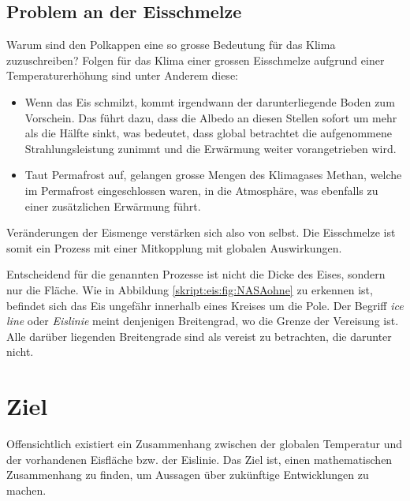 \begin{refsection}
\subsection{Problem an der Eisschmelze} \label{skript:eis:Problem an der Eisschmelze}
Warum sind den Polkappen eine so grosse Bedeutung für das Klima zuzuschreiben? Folgen für das Klima einer grossen Eisschmelze aufgrund einer Temperaturerhöhung sind unter Anderem diese: 
\begin{itemize}
	\item Wenn das Eis schmilzt, kommt irgendwann der darunterliegende Boden zum Vorschein. Das führt dazu, dass die Albedo an diesen Stellen sofort um mehr als die Hälfte sinkt, was bedeutet, dass global betrachtet die aufgenommene Strahlungsleistung zunimmt und die Erwärmung weiter vorangetrieben wird.
	\item Taut Permafrost auf, gelangen grosse Mengen des Klimagases Methan, welche im Permafrost eingeschlossen waren, in die Atmosphäre, was ebenfalls zu einer zusätzlichen Erwärmung führt.
\end{itemize}
Veränderungen der Eismenge verstärken sich also von selbst.
Die Eisschmelze ist somit ein Prozess mit einer Mitkopplung mit globalen Auswirkungen.

Entscheidend für die genannten Prozesse ist nicht die Dicke des Eises, sondern nur die Fläche. Wie in Abbildung \ref{skript:eis:fig:NASAohne} zu erkennen ist, befindet sich das Eis ungefähr innerhalb eines Kreises um die Pole. Der Begriff {\em ice line} oder {\em Eislinie} meint denjenigen Breitengrad, wo die Grenze der Vereisung ist.
%
%
Alle darüber liegenden Breitengrade sind als vereist zu betrachten, die darunter nicht.
\section{Ziel}
Offensichtlich existiert ein Zusammenhang zwischen der globalen Temperatur und der vorhandenen Eisfläche bzw. der Eislinie. Das Ziel ist, einen mathematischen Zusammenhang zu finden, um Aussagen über zukünftige Entwicklungen zu machen.

\end{refsection}
